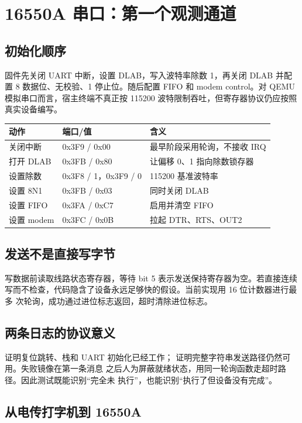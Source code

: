 \chapter{16550A 串口：第一个观测通道}

\section{初始化顺序}

固件先关闭 UART 中断，设置 DLAB，写入波特率除数 1，再关闭 DLAB 并配置
8 数据位、无校验、1 停止位。随后配置 FIFO 和 modem control。对 QEMU
模拟串口而言，宿主终端不真正按 115200 波特限制吞吐，但寄存器协议仍应按照
真实设备编写。

\begin{longtable}{p{}p{}p{}}
\toprule
动作 & 端口/值 & 含义 \\
\midrule
关闭中断 & 0x3F9 / 0x00 & 最早阶段采用轮询，不接收 IRQ \\
打开 DLAB & 0x3FB / 0x80 & 让偏移 0、1 指向除数锁存器 \\
设置除数 & 0x3F8 / 1，0x3F9 / 0 & 115200 基准波特率 \\
设置 8N1 & 0x3FB / 0x03 & 同时关闭 DLAB \\
设置 FIFO & 0x3FA / 0xC7 & 启用并清空 FIFO \\
设置 modem & 0x3FC / 0x0B & 拉起 DTR、RTS、OUT2 \\
\bottomrule
\end{longtable}

\section{发送不是直接写字节}

写数据前读取线路状态寄存器，等待 bit 5 表示发送保持寄存器为空。若直接连续
写而不检查，代码隐含了设备永远足够快的假设。当前实现用 16 位计数器进行最多
 次轮询，成功通过进位标志返回，超时清除进位标志。

\section{两条日志的协议意义}

 证明复位跳转、栈和 UART 初始化已经工作；
 证明完整字符串发送路径仍然可用。失败镜像在第一条消息
之后人为屏蔽就绪状态，用同一轮询函数走超时路径。因此测试既能识别“完全未
执行”，也能识别“执行了但设备没有完成”。

\section{从电传打字机到 16550A}

